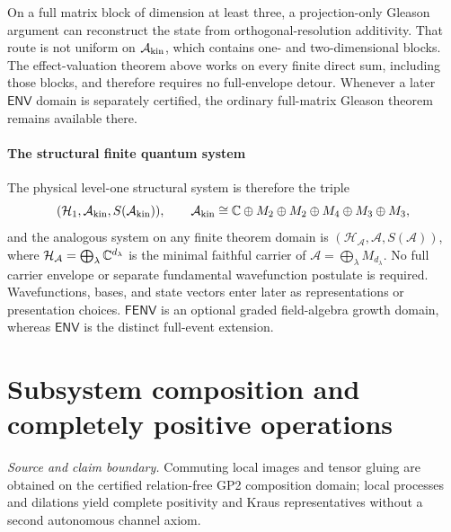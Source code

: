 \documentclass[12pt,a4paper]{article}
\begin{document}
\begin{remark}
\label{p4:rem:gleason-available}
On a full matrix block of dimension at least three, a projection-only Gleason
argument can reconstruct the state from orthogonal-resolution additivity.
That route is not uniform on \(\mathcal A_{\rm kin}\), which contains
one- and two-dimensional blocks.  The effect-valuation theorem above works on
every finite direct sum, including those blocks, and therefore requires no
full-envelope detour.  Whenever a later \(\mathsf{ENV}\) domain is separately
certified, the ordinary full-matrix Gleason theorem remains available there.
\end{remark}





\paragraph{The structural finite quantum system}
\label{p4:sec:part1-full-carrier}

The physical level-one structural system is therefore the triple
\begin{equation}
\label{p4:eq:part1-carrier-pair}
(\mathcal H_1,\mathcal A_{\rm kin},S(\mathcal A_{\rm kin})),
\qquad
\mathcal A_{\rm kin}
\cong\mathbb{C}\oplus M_2\oplus M_2\oplus M_4\oplus M_3\oplus M_3,
\end{equation}
and the analogous system on any finite theorem domain is
\((\mathcal H_{\mathcal A},\mathcal A,S(\mathcal A))\), where
\(\mathcal H_{\mathcal A}=\bigoplus_\lambda\mathbb{C}^{d_\lambda}\) is the minimal
faithful carrier of \(\mathcal A=\bigoplus_\lambda M_{d_\lambda}\).  No full
carrier envelope or separate fundamental wavefunction postulate is required.
Wavefunctions, bases, and state vectors enter later as representations or
presentation choices.  \(\mathsf{FENV}\) is an optional graded field-algebra
growth domain, whereas \(\mathsf{ENV}\) is the distinct full-event extension.



\section{Subsystem composition and completely positive operations}
\label{p4a:sec:v238-a4}
\noindent\textit{Source and claim boundary.} Commuting local images and tensor gluing are obtained on the certified relation-free GP2 composition domain; local processes and dilations yield complete positivity and Kraus representatives without a second autonomous channel axiom.
\end{document}
